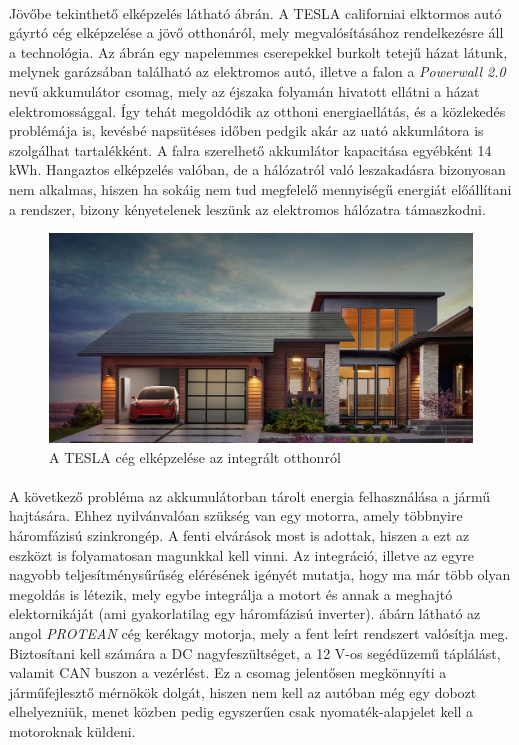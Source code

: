 \paragraph{}
Jövőbe tekinthető elképzelés látható  ábrán. A TESLA californiai elktormos autó gáyrtó cég elképzelése a jövő otthonáról, mely megvalósításához rendelkezésre áll a technológia. Az ábrán egy napelemmes cserepekkel burkolt tetejű házat látunk, melynek garázsában található az elektromos autó, illetve a falon a \emph{Powerwall 2.0} nevű akkumulátor csomag, mely az éjszaka folyamán hivatott ellátni a házat elektromossággal. Így tehát megoldódik az otthoni energiaellátás, és a közlekedés problémája is, kevésbé napsütéses időben pedgik akár az uató akkumlátora is szolgálhat tartalékként. A falra szerelhető akkumlátor kapacitása egyébként 14 kWh. Hangaztos elképzelés valóban, de a hálózatról való leszakadásra bizonyosan nem alkalmas, hiszen ha sokáig nem tud megfelelő mennyiségű energiát előállítani a rendszer, bizony kényetelenek leszünk az elektromos hálózatra támaszkodni. 

\begin{figure}[h]
	\centering
	\includegraphics[width = \textwidth]{figures/section-solar.jpg}
	\caption{A TESLA cég elképzelése az integrált otthonról} 
	\label{fig:tesla_home}
\end{figure}



\paragraph{}
A következő probléma az akkumulátorban tárolt energia felhasználása a jármű hajtására. Ehhez nyilvánvalóan szükség van egy motorra, amely többnyire háromfázisú szinkrongép. A fenti elvárások most is adottak, hiszen a ezt az eszközt is folyamatosan magunkkal kell vinni. Az integráció, illetve az egyre nagyobb teljesítménysűrűség elérésének igényét mutatja, hogy ma már több olyan megoldás is létezik, mely egybe integrálja a motort és annak a meghajtó elektornikáját (ami gyakorlatilag egy háromfázisú inverter).  ábárn látható az angol \emph{PROTEAN} cég kerékagy motorja, mely a fent leírt rendszert valósítja meg. Biztosítani kell számára a DC nagyfeszültséget, a 12 V-os segédüzemű táplálást, valamit CAN buszon a vezérlést. Ez a csomag jelentősen megkönnyíti a járműfejlesztő mérnökök dolgát, hiszen nem kell az autóban még egy dobozt elhelyezniük, menet közben pedig egyszerűen csak nyomaték-alapjelet kell a motoroknak küldeni.

